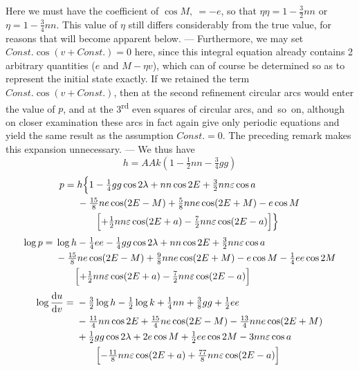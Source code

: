\clearpage
\begingroup
{}
\renewcommand{\headrulewidth}{0pt}
\noindent Here we must have the coefficient of \(\cos M,\ =-e\),
so that \(\eta\eta=1-\tfrac32nn\) or \(\eta=1-\tfrac34nn\).
This value of \(\eta\) still differs considerably
from the true value, for reasons that will become apparent below. --- Furthermore,
we may set \(\mathit{Const.}\cos(v+\mathit{Const.})=0\) here,
since this integral equation already contains 2 arbitrary quantities
(\(e\) and \(M-\eta v\)), which can of course be determined
so as to represent the initial state exactly. If we retained the term
\(\mathit{Const.}\cos(v+\mathit{Const.})\), then at the second
refinement circular arcs would enter the value of \(p\), and at the
3\textsuperscript{rd} even squares of circular arcs, and~so~on, although
on closer examination these arcs in fact again give only periodic
equations and yield the same result as the assumption \(\mathit{Const.}=0\).
The preceding remark makes this expansion unnecessary. ---
We thus have
\[
 h=AAk(1-\tfrac12nn-\tfrac34gg)
\]
\[
\begin{aligned}
 p={}&h\Bigl\{1-\tfrac14gg\cos2\lambda+nn\cos2E+\tfrac32nn\varepsilon\cos a\\
 &-\tfrac{15}{8}ne\cos(2E-M)+\tfrac58nne\cos(2E+M)-e\cos M\\
 &\qquad\Bigl[+\tfrac12nn\varepsilon\cos(2E+a)
                  -\tfrac72nn\varepsilon\cos(2E-a)\Bigr]\Bigr\}
\end{aligned}
\]
\[
\begin{aligned}
 \log p={}&\log h-\tfrac14ee-\tfrac14gg\cos2\lambda+nn\cos2E
                  +\tfrac32nn\varepsilon\cos a\\
 &-\tfrac{15}{8}ne\cos(2E-M)+\tfrac98nne\cos(2E+M)
                  -e\cos M-\tfrac14ee\cos2M\\
 &\qquad\Bigl[+\tfrac12nn\varepsilon\cos(2E+a)
                  -\tfrac72nn\varepsilon\cos(2E-a)\Bigr]
\end{aligned}
\]
\[
\begin{aligned}
 \log\frac{\mathrm{d}u}{\mathrm{d}v}
   ={}&-\tfrac32\log h-\tfrac12\log k+\tfrac14nn+\tfrac38gg+\tfrac12ee\\
 &-\tfrac{11}{4}nn\cos2E+\tfrac{15}{4}ne\cos(2E-M)
                   -\tfrac{13}{4}nne\cos(2E+M)\\
 &+\tfrac12gg\cos2\lambda+2e\cos M+\tfrac12ee\cos2M-3nn\varepsilon\cos a\\
 &\qquad\Bigl[-\tfrac{11}{8}nn\varepsilon\cos(2E+a)
                   +\tfrac{77}{8}nn\varepsilon\cos(2E-a)\Bigr]
\end{aligned}
\]

